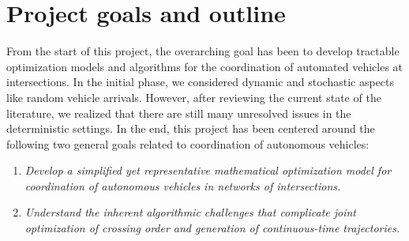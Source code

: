 \documentclass[a4paper]{report}
\theoremstyle{definition}
\theoremstyle{plain}
\begin{document}

\section{Project goals and outline}


From the start of this project, the overarching goal has been to develop
tractable optimization models and algorithms for the coordination of automated
vehicles at intersections.
%
%
In the initial phase, we considered dynamic and stochastic aspects like random
vehicle arrivals. However, after reviewing the current state of the literature,
we realized that there are still many unresolved issues in the deterministic
settings.
%
In the end, this project has been centered around the following two general
goals related to coordination of autonomous vehicles:

\begin{enumerate}[label=\textbullet, leftmargin=3em, rightmargin=4em]
  \item \emph{Develop a simplified yet representative mathematical optimization model
        for coordination of autonomous vehicles in networks of intersections.}

  \item \emph{Understand the inherent algorithmic challenges that complicate joint
        optimization of crossing order and generation of continuous-time
        trajectories.}
\end{enumerate}
\end{document}
